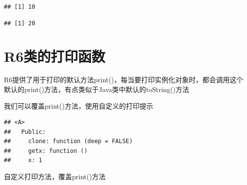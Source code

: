 \documentclass[]{book}
\newenvironment{Shaded}{\begin{snugshade}}{\end{snugshade}}
\newcommand{\KeywordTok}[1]{\textcolor[rgb]{0.13,0.29,0.53}{\textbf{#1}}}
\newcommand{\DataTypeTok}[1]{\textcolor[rgb]{0.13,0.29,0.53}{#1}}
\newcommand{\DecValTok}[1]{\textcolor[rgb]{0.00,0.00,0.81}{#1}}
\newcommand{\StringTok}[1]{\textcolor[rgb]{0.31,0.60,0.02}{#1}}
\newcommand{\CommentTok}[1]{\textcolor[rgb]{0.56,0.35,0.01}{\textit{#1}}}
\newcommand{\ControlFlowTok}[1]{\textcolor[rgb]{0.13,0.29,0.53}{\textbf{#1}}}
\newcommand{\OperatorTok}[1]{\textcolor[rgb]{0.81,0.36,0.00}{\textbf{#1}}}
\newcommand{\NormalTok}[1]{#1}
\begin{document}
\begin{verbatim}
## [1] 10
\end{verbatim}

\begin{Shaded}
\end{Shaded}

\begin{verbatim}
## [1] 20
\end{verbatim}

\section{R6类的打印函数}\label{r6}

R6提供了用于打印的默认方法print()，每当要打印实例化对象时，都会调用这个默认的print()方法，有点类似于Java类中默认的toString()方法

我们可以覆盖print()方法，使用自定义的打印提示

\begin{Shaded}
\end{Shaded}

\begin{verbatim}
## <A>
##   Public:
##     clone: function (deep = FALSE) 
##     getx: function () 
##     x: 1
\end{verbatim}

自定义打印方法，覆盖print()方法
\end{document}
